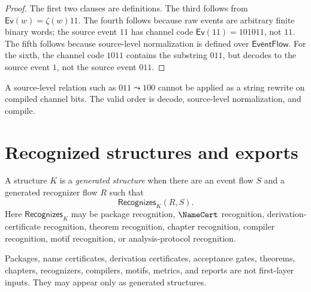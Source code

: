 \begin{proof}
The first two clauses are definitions. The third follows from $\mathsf{Ev}(w)=\zeta(w)11$. The fourth follows because raw events are arbitrary finite binary words; the source event $11$ has channel code $\mathsf{Ev}(11)=101011$, not $11$. The fifth follows because source-level normalization is defined over $\mathsf{EventFlow}$. For the sixth, the channel code $1011$ contains the substring $011$, but decodes to the source event $1$, not the source event $011$.
\end{proof}

\begin{corollary}
\label{cor:main-theorems-carry-not-channel-rewrite}
A source-level relation such as $011\leadsto 100$ cannot be applied as a string rewrite on compiled channel bits. The valid order is decode, source-level normalization, and compile.
\end{corollary}

\section{Recognized structures and exports}
\label{sec:main-theorems-recognized-structures-exports}

\begin{definition}
\label{def:main-theorems-generated-structure}
A structure $K$ is a \emph{generated structure} when there are an event flow $S$ and a generated recognizer flow $R$ such that
$$
  \mathsf{Recognizes}_K(R,S).
$$
Here $\mathsf{Recognizes}_K$ may be package recognition, $\NameCert$ recognition, derivation-certificate recognition, theorem recognition, chapter recognition, compiler recognition, motif recognition, or analysis-protocol recognition.
\end{definition}

\begin{theorem}
\label{thm:main-theorems-structure-emergence}
Packages, name certificates, derivation certificates, acceptance gates, theorems, chapters, recognizers, compilers, motifs, metrics, and reports are not first-layer inputs. They may appear only as generated structures.
\end{theorem}

